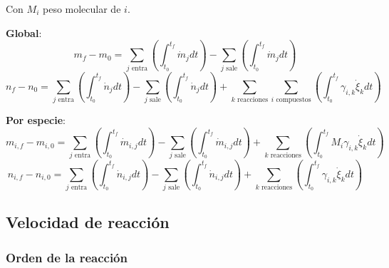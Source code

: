             Con \(M_{i}\) peso molecular de \(i\).
            
            
            \textbf{Global}:
            \begin{equation}
            \label{eq:bm_rxn_global_int}
                m_{f} - m_{0} = \sum_{j \text{ entra}} \left ( \int_{t_{0}}^{t_{f}} \dot{m}_{j} dt \right ) - \sum_{j \text{ sale}} \left ( \int_{t_{0}}^{t_{f}} \dot{m}_{j} dt \right )
            \end{equation}
            \begin{equation}
            \label{eq:bm_rxn_global_int_mol}
                n_{f} - n_{0} = \sum_{j \text{ entra}} \left ( \int_{t_{0}}^{t_{f}} \dot{n}_{j} dt \right ) - \sum_{j \text{ sale}} \left ( \int_{t_{0}}^{t_{f}} \dot{n}_{j} dt \right ) + \sum_{k \text{ reacciones}} \sum_{i \text{ compuestos}} \left ( \int_{t_{0}}^{t_{f}} \gamma_{i,k} \dot{\xi}_{k} dt \right )
            \end{equation}
            
            \textbf{Por especie}:
            \begin{equation}
            \label{eq:bm_rxn_sp_int}
                m_{i,f} - m_{i,0} = \sum_{j \text{ entra}} \left ( \int_{t_{0}}^{t_{f}} \dot{m}_{i,j} dt \right ) - \sum_{j \text{ sale}} \left ( \int_{t_{0}}^{t_{f}} \dot{m}_{i,j} dt \right )  + \sum_{k \text{ reacciones}} \left ( \int_{t_{0}}^{t_{f}} M_{i} \gamma_{i,k} \dot{\xi}_{k} dt \right )
            \end{equation}
            \begin{equation}
            \label{eq:bm_rxn_sp_int_mol}
                n_{i,f} - n_{i,0} = \sum_{j \text{ entra}} \left ( \int_{t_{0}}^{t_{f}} \dot{n}_{i,j} dt \right ) - \sum_{j \text{ sale}} \left ( \int_{t_{0}}^{t_{f}} \dot{n}_{i,j} dt \right )  + \sum_{k \text{ reacciones}} \left ( \int_{t_{0}}^{t_{f}} \gamma_{i,k} \dot{\xi}_{k} dt \right )
            \end{equation}
    
    \subsection{Velocidad de reacción}
    
        \subsubsection{Orden de la reacción}
        
